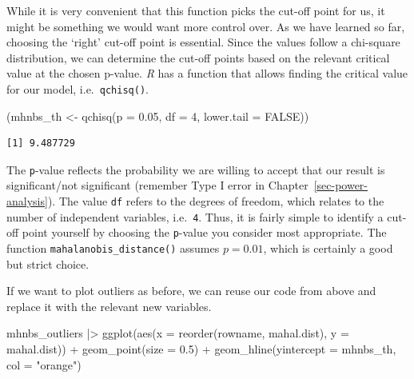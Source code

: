 \documentclass[
  letterpaper,
  DIV=11,
  numbers=noendperiod]{scrreprt}
\newenvironment{Shaded}{\begin{snugshade}}{\end{snugshade}}
\newcommand{\AttributeTok}[1]{\textcolor[rgb]{0.40,0.45,0.13}{#1}}
\newcommand{\ConstantTok}[1]{\textcolor[rgb]{0.56,0.35,0.01}{#1}}
\newcommand{\DecValTok}[1]{\textcolor[rgb]{0.68,0.00,0.00}{#1}}
\newcommand{\FloatTok}[1]{\textcolor[rgb]{0.68,0.00,0.00}{#1}}
\newcommand{\FunctionTok}[1]{\textcolor[rgb]{0.28,0.35,0.67}{#1}}
\newcommand{\NormalTok}[1]{\textcolor[rgb]{0.00,0.23,0.31}{#1}}
\newcommand{\OtherTok}[1]{\textcolor[rgb]{0.00,0.23,0.31}{#1}}
\newcommand{\SpecialCharTok}[1]{\textcolor[rgb]{0.37,0.37,0.37}{#1}}
\newcommand{\StringTok}[1]{\textcolor[rgb]{0.13,0.47,0.30}{#1}}
\begin{document}
While it is very convenient that this function picks the cut-off point
for us, it might be something we would want more control over. As we
have learned so far, choosing the `right' cut-off point is essential.
Since the values follow a chi-square distribution, we can determine the
cut-off points based on the relevant critical value at the chosen
p-value. \emph{R} has a function that allows finding the critical value
for our model, i.e.~\texttt{qchisq()}.

\begin{Shaded}
\begin{Highlighting}[]
\NormalTok{(mhnbs\_th }\OtherTok{\textless{}{-}} \FunctionTok{qchisq}\NormalTok{(}\AttributeTok{p =} \FloatTok{0.05}\NormalTok{,}
                    \AttributeTok{df =} \DecValTok{4}\NormalTok{,}
                    \AttributeTok{lower.tail =} \ConstantTok{FALSE}\NormalTok{))}
\end{Highlighting}
\end{Shaded}

\begin{verbatim}
[1] 9.487729
\end{verbatim}

The \texttt{p}-value reflects the probability we are willing to accept
that our result is significant/not significant (remember Type I error in
Chapter~\ref{sec-power-analysis}). The value \texttt{df} refers to the
degrees of freedom, which relates to the number of independent
variables, i.e.~\texttt{4}. Thus, it is fairly simple to identify a
cut-off point yourself by choosing the \texttt{p}-value you consider
most appropriate. The function \texttt{mahalanobis\_distance()} assumes
\(p = 0.01\), which is certainly a good but strict choice.

If we want to plot outliers as before, we can reuse our code from above
and replace it with the relevant new variables.

\begin{Shaded}
\begin{Highlighting}[]
\NormalTok{mhnbs\_outliers }\SpecialCharTok{|\textgreater{}}
  \FunctionTok{ggplot}\NormalTok{(}\FunctionTok{aes}\NormalTok{(}\AttributeTok{x =} \FunctionTok{reorder}\NormalTok{(rowname, mahal.dist),}
             \AttributeTok{y =}\NormalTok{ mahal.dist)) }\SpecialCharTok{+}
  \FunctionTok{geom\_point}\NormalTok{(}\AttributeTok{size =} \FloatTok{0.5}\NormalTok{) }\SpecialCharTok{+}
  \FunctionTok{geom\_hline}\NormalTok{(}\AttributeTok{yintercept =}\NormalTok{ mhnbs\_th, }\AttributeTok{col =} \StringTok{"orange"}\NormalTok{)}
\end{Highlighting}
\end{Shaded}
\end{document}
